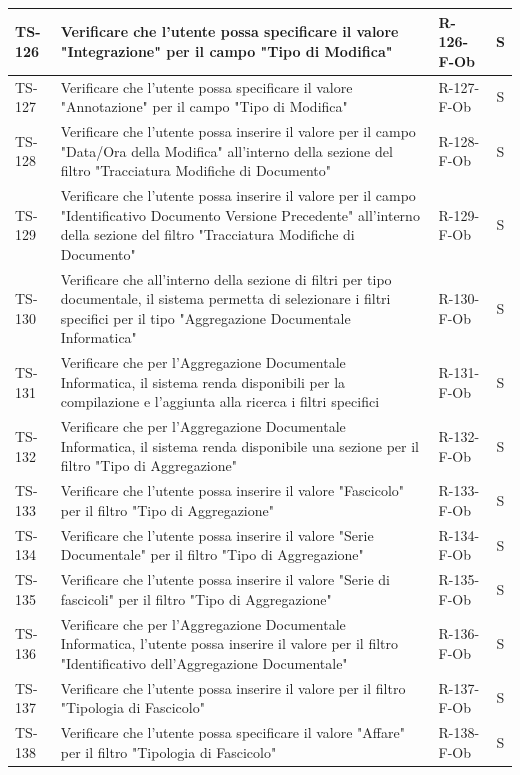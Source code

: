 \documentclass[a4paper,12pt]{article}
\begin{document}
\begin{longtable}{|p{1.5cm}|p{8.3cm}|p{2.4cm}|c|}
\hline
TS-126 & Verificare che l'utente possa specificare il valore "Integrazione" per il campo "Tipo di Modifica" & R-126-F-Ob & S \\
\hline
TS-127 & Verificare che l'utente possa specificare il valore "Annotazione" per il campo "Tipo di Modifica" & R-127-F-Ob & S \\
\hline
TS-128 & Verificare che l'utente possa inserire il valore per il campo "Data/Ora della Modifica" all'interno della sezione del filtro "Tracciatura Modifiche di Documento" & R-128-F-Ob & S \\
\hline
TS-129 & Verificare che l'utente possa inserire il valore per il campo "Identificativo Documento Versione Precedente" all'interno della sezione del filtro "Tracciatura Modifiche di Documento" & R-129-F-Ob & S \\
\hline
TS-130 & Verificare che all'interno della sezione di filtri per tipo documentale, il sistema permetta di selezionare i filtri specifici per il tipo "Aggregazione Documentale Informatica" & R-130-F-Ob & S \\
\hline
TS-131 & Verificare che per l'Aggregazione Documentale Informatica, il sistema renda disponibili per la compilazione e l'aggiunta alla ricerca i filtri specifici & R-131-F-Ob  & S \\
\hline
TS-132 & Verificare che per l'Aggregazione Documentale Informatica, il sistema renda disponibile una sezione per il filtro "Tipo di Aggregazione" & R-132-F-Ob & S \\
\hline
TS-133 & Verificare che l'utente possa inserire il valore "Fascicolo" per il filtro "Tipo di Aggregazione" & R-133-F-Ob & S \\
\hline
TS-134 & Verificare che l'utente possa inserire il valore "Serie Documentale" per il filtro "Tipo di Aggregazione" & R-134-F-Ob & S \\
\hline
TS-135 & Verificare che l'utente possa inserire il valore "Serie di fascicoli" per il filtro "Tipo di Aggregazione" & R-135-F-Ob & S \\
\hline
TS-136 & Verificare che per l'Aggregazione Documentale Informatica, l'utente possa inserire il valore per il filtro "Identificativo dell'Aggregazione Documentale" & R-136-F-Ob & S \\
\hline
TS-137 & Verificare che l'utente possa inserire il valore per il filtro "Tipologia di Fascicolo" & R-137-F-Ob & S \\
\hline
TS-138 & Verificare che l'utente possa specificare il valore "Affare" per il filtro "Tipologia di Fascicolo" & R-138-F-Ob & S \\

\end{longtable}
\end{document}
